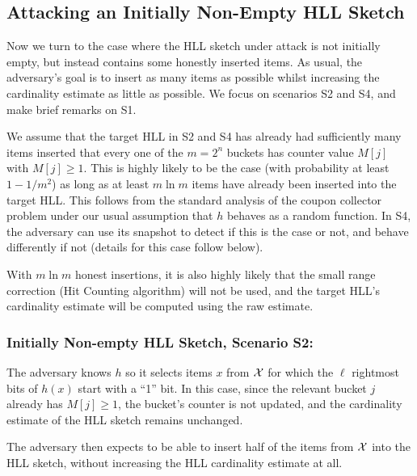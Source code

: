 \documentclass{article}
\begin{document}
\subsection{Attacking an Initially Non-Empty HLL Sketch}\label{sec:nonempty}

Now we turn to the case where the HLL sketch under attack is not initially empty, but instead contains some honestly inserted items. As usual, the adversary's goal is to insert as many items as possible whilst increasing the cardinality estimate as little as possible. We focus on scenarios S2 and S4, and make brief remarks on S1.

We assume that the target HLL in S2 and S4 has already had sufficiently many items inserted that every one of the $m=2^n$ buckets has counter value $M[j]$ with $M[j] \ge 1$. This is highly likely to be the case (with probability at least $1-1/m^2$) as long as at least $m\ln m$ items have already been inserted into the target HLL. This follows from the standard analysis of the coupon collector problem under our usual assumption that $h$ behaves as a random function.
In S4, the adversary can use its snapshot to detect if this is the case or not, and behave differently if not (details for this case follow below).

With $m \ln m$ honest insertions, it is also highly likely that the small range correction (Hit Counting algorithm) will not be used, and the target HLL's cardinality estimate will be computed using the raw estimate.


\subsubsection{Initially Non-empty HLL Sketch, Scenario S2:}\label{sec:nonemptyHLLS2}
The adversary knows $h$ so it selects items $x$ from ${\cal X}$ for which the $\ell$ rightmost bits of $h(x)$ start with a ``1'' bit. In this case, since the relevant bucket $j$ already has $M[j] \ge 1$, the bucket's counter is not updated, and the cardinality estimate of the HLL sketch remains unchanged. 

The adversary then expects to be able to insert half of the items from ${\cal X}$ into the HLL sketch, without increasing the HLL cardinality estimate at all.
\end{document}
